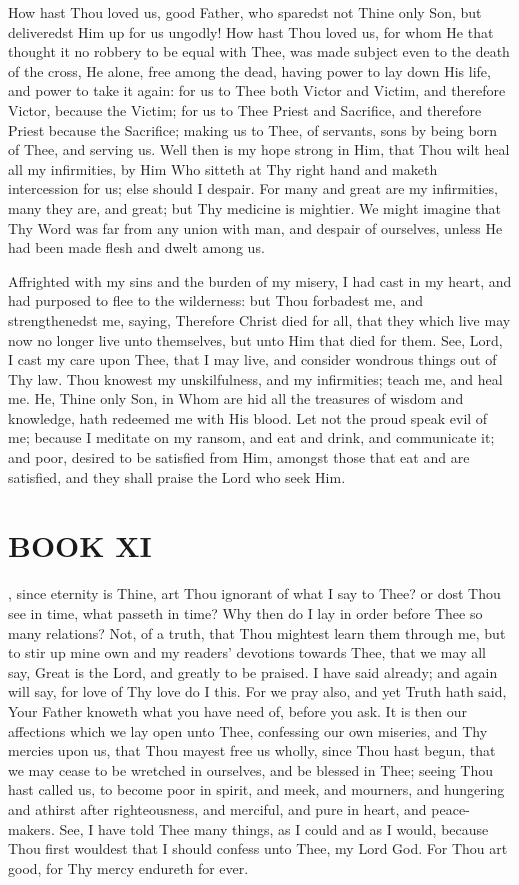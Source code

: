\documentclass[b5paper,openright,12pt,twoside]{book}
\begin{document}
How hast Thou loved us, good Father, who sparedst not Thine only Son,
but deliveredst Him up for us ungodly! How hast Thou loved us, for whom
He that thought it no robbery to be equal with Thee, was made subject
even to the death of the cross, He alone, free among the dead, having
power to lay down His life, and power to take it again: for us to Thee
both Victor and Victim, and therefore Victor, because the Victim; for
us to Thee Priest and Sacrifice, and therefore Priest because the
Sacrifice; making us to Thee, of servants, sons by being born of Thee,
and serving us. Well then is my hope strong in Him, that Thou wilt heal
all my infirmities, by Him Who sitteth at Thy right hand and maketh
intercession for us; else should I despair. For many and great are my
infirmities, many they are, and great; but Thy medicine is mightier. We
might imagine that Thy Word was far from any union with man, and despair
of ourselves, unless He had been made flesh and dwelt among us.

Affrighted with my sins and the burden of my misery, I had cast in my
heart, and had purposed to flee to the wilderness: but Thou forbadest
me, and strengthenedst me, saying, Therefore Christ died for all, that
they which live may now no longer live unto themselves, but unto Him
that died for them. See, Lord, I cast my care upon Thee, that I may
live, and consider wondrous things out of Thy law. Thou knowest my
unskilfulness, and my infirmities; teach me, and heal me. He, Thine only
Son, in Whom are hid all the treasures of wisdom and knowledge, hath
redeemed me with His blood. Let not the proud speak evil of me; because
I meditate on my ransom, and eat and drink, and communicate it; and
poor, desired to be satisfied from Him, amongst those that eat and are
satisfied, and they shall praise the Lord who seek Him.




\chapter{BOOK XI}


, since eternity is Thine, art Thou ignorant of what I say to Thee?
or dost Thou see in time, what passeth in time? Why then do I lay in
order before Thee so many relations? Not, of a truth, that Thou mightest
learn them through me, but to stir up mine own and my readers' devotions
towards Thee, that we may all say, Great is the Lord, and greatly to be
praised. I have said already; and again will say, for love of Thy
love do I this. For we pray also, and yet Truth hath said, Your Father
knoweth what you have need of, before you ask. It is then our affections
which we lay open unto Thee, confessing our own miseries, and Thy
mercies upon us, that Thou mayest free us wholly, since Thou hast begun,
that we may cease to be wretched in ourselves, and be blessed in Thee;
seeing Thou hast called us, to become poor in spirit, and meek, and
mourners, and hungering and athirst after righteousness, and merciful,
and pure in heart, and peace-makers. See, I have told Thee many things,
as I could and as I would, because Thou first wouldest that I should
confess unto Thee, my Lord God. For Thou art good, for Thy mercy
endureth for ever.
\end{document}
